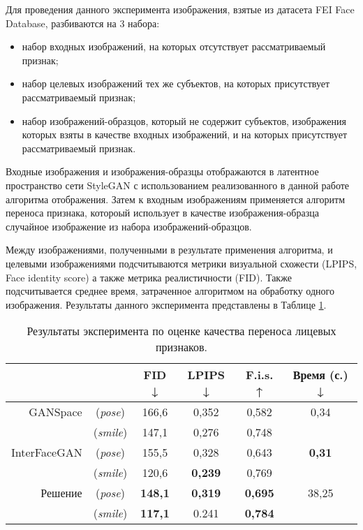 Для проведения данного эксперимента изображения, взятые из датасета FEI Face Database, разбиваются на 3 набора:
\begin{itemize}

\item набор входных изображений, на которых отсутствует рассматриваемый признак;
\item набор целевых изображений тех же субъектов, на которых присутствует рассматриваемый признак; 
\item набор изображений-образцов, который не содержит субъектов, изображения которых взяты в качестве входных изображений, и на которых присутствует рассматриваемый признак.
\end{itemize}
Входные изображения и изображения-образцы отображаются в латентное пространство сети StyleGAN с использованием реализованного в данной работе алгоритма отображения.
Затем к входным изображениям применяется алгоритм переноса признака, котороый использует в качестве изображения-образца случайное изображение из набора изображений-образцов.

Между изображениями, полученными в результате применения алгоритма, и целевыми изображениями подсчитываются метрики визуальной схожести (LPIPS, Face identity score) а также метрика реалистичности (FID).
Также подсчитывается среднее время, затраченное алгоритмом на обработку одного изображения.
Результаты данного эксперимента представлены в Таблице \ref{tab:exp2}.

\begin{table}
\begin{center}
  \caption{Результаты эксперимента по оценке качества переноса лицевых признаков.}
  \label{tab:exp2}
  \begin{tabular}{ |r c|c|c|c|c| } 
    \hline
      & & FID ↓ & LPIPS ↓ & F.i.s. ↑ & Время (с.) ↓ \\ 
    \hline\hline
    GANSpace & (\emph{pose}) & 166,6 & 0,352 & 0,582 & 0,34 \\
            & (\emph{smile}) & 147,1 & 0,276 & 0,748 &  \\
    \hline
    InterFaceGAN 
             & (\emph{pose}) & 155,5 & 0,328 & 0,643 & \textbf{0,31} \\
            & (\emph{smile}) & 120,6 & \textbf{0,239} & 0,769 & \\
    \hline
    Решение  & (\emph{pose}) & \textbf{148,1} & \textbf{0,319} & \textbf{0,695} & 38,25 \\ 
            & (\emph{smile}) & \textbf{117,1} & 0.241 & \textbf{0,784} &  \\ 
    \hline
  \end{tabular}
\end{center}
\end{table}

